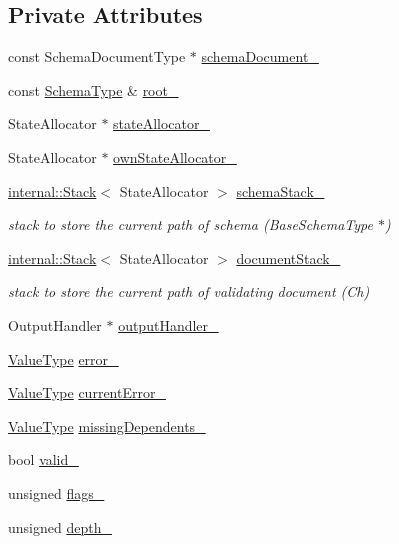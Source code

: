 \subsection*{Private Attributes}
\begin{DoxyCompactItemize}
\item 
const Schema\+Document\+Type $\ast$ \hyperlink{classGenericSchemaValidator_a433e6fe22bea392d1dbd57e9f581bd7a}{schema\+Document\+\_\+}
\item 
const \hyperlink{classGenericSchemaValidator_ac79628f00f6720bbabb70b44f0d076a0}{Schema\+Type} \& \hyperlink{classGenericSchemaValidator_a7517bd5334a8fc4696fe298dbab2ce31}{root\+\_\+}
\item 
State\+Allocator $\ast$ \hyperlink{classGenericSchemaValidator_a1fea37905619d085cb3d3c6699b209a5}{state\+Allocator\+\_\+}
\item 
State\+Allocator $\ast$ \hyperlink{classGenericSchemaValidator_a1f8233bfa10ae88aac6137a0e979174b}{own\+State\+Allocator\+\_\+}
\item 
\hyperlink{classinternal_1_1Stack}{internal\+::\+Stack}$<$ State\+Allocator $>$ \hyperlink{classGenericSchemaValidator_ae5775fdd9f94b8a2581f774d97135670}{schema\+Stack\+\_\+}
\begin{DoxyCompactList}\small\item\em stack to store the current path of schema (Base\+Schema\+Type $\ast$) \end{DoxyCompactList}\item 
\hyperlink{classinternal_1_1Stack}{internal\+::\+Stack}$<$ State\+Allocator $>$ \hyperlink{classGenericSchemaValidator_a98a99734991555b5458398b01f0cce44}{document\+Stack\+\_\+}
\begin{DoxyCompactList}\small\item\em stack to store the current path of validating document (Ch) \end{DoxyCompactList}\item 
Output\+Handler $\ast$ \hyperlink{classGenericSchemaValidator_ac03855c6eb85ffcae993105082e09fc1}{output\+Handler\+\_\+}
\item 
\hyperlink{classGenericSchemaValidator_a435890a2dddeecb896d4ac76de03ca68}{Value\+Type} \hyperlink{classGenericSchemaValidator_a9c3e6efc65a62225a83ae9d0f377c074}{error\+\_\+}
\item 
\hyperlink{classGenericSchemaValidator_a435890a2dddeecb896d4ac76de03ca68}{Value\+Type} \hyperlink{classGenericSchemaValidator_afa09db405ea6ce3f35d04401c89023f4}{current\+Error\+\_\+}
\item 
\hyperlink{classGenericSchemaValidator_a435890a2dddeecb896d4ac76de03ca68}{Value\+Type} \hyperlink{classGenericSchemaValidator_a08633a530070c002f9f0016991a22187}{missing\+Dependents\+\_\+}
\item 
bool \hyperlink{classGenericSchemaValidator_a637361bc6c37c60278576169f01c84bb}{valid\+\_\+}
\item 
unsigned \hyperlink{classGenericSchemaValidator_ab56d66840b9f7afe8a806e31afa10a10}{flags\+\_\+}
\item 
unsigned \hyperlink{classGenericSchemaValidator_ac90e249c2d8d5e68631e3f8ce44b15fe}{depth\+\_\+}
\end{DoxyCompactItemize}
